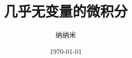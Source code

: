 \title{几乎无变量的微积分}
\author{纳纳米}
\date{\today}

\providecommand*{\thesubtitle}{%
    \pageref{calculus:LastPage}~分快速上手}

\providecommand*{\theversion}{\ApproxToTwoPi[3]}
